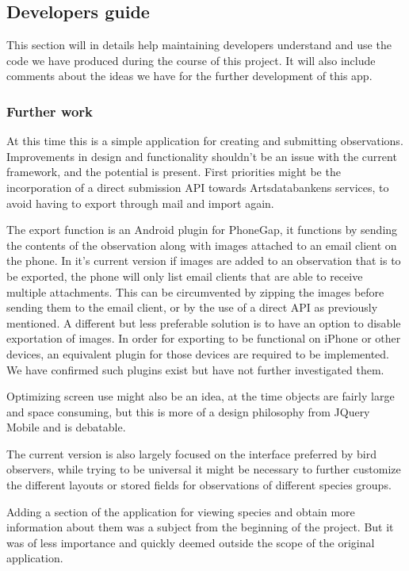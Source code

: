 \subsection{Developers guide}

This section will in details help maintaining developers understand and use the
code we have produced during the course of this project. It will also include
comments about the ideas we have for the further development of this app.

\subsubsection{Further work}
\label{sec:developer-guide-further-work}

At this time this is a simple application for creating and submitting
observations. Improvements in design and functionality shouldn't be an issue with the current framework,
and the potential is present. First priorities might be the incorporation of a
direct submission API towards Artsdatabankens services, to avoid having to
export through mail and import again. 

The export function is an Android plugin for PhoneGap, it functions by sending the contents 
of the observation along with images attached to an email client on the phone. 
In it's current version if images are added to an observation that is to be 
exported, the phone will only list email clients that are able to receive multiple attachments.
This can be circumvented by zipping the images before sending them to the email client, or by the use
of a direct API as previously mentioned. A different but less preferable solution is to have an option
to disable exportation of images.
In order for exporting to be functional on iPhone or other devices, an equivalent
plugin for those devices are required to be implemented. We have confirmed such plugins exist but have
not further investigated them.

Optimizing screen use might also be an
idea, at the time objects are fairly large and space consuming, but this is
more of a design philosophy from JQuery Mobile and is debatable.

The current version is also largely focused on the interface preferred by bird observers, 
while trying to be universal it might be necessary to further customize the different 
layouts or stored fields for observations of different species groups.

Adding a section of the application for viewing species and obtain more
information about them was a subject from the beginning of the project.  But it
was of less importance and quickly deemed outside the scope of the original
application.

